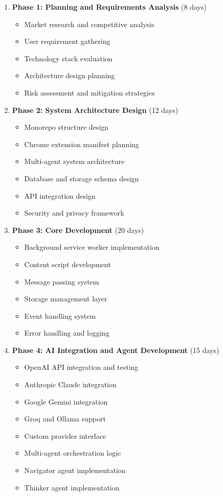 \documentclass[12pt,a4paper]{article}
\begin{document}
\begin{enumerate}
    \item \textbf{Phase 1: Planning and Requirements Analysis} (8 days)
    \begin{itemize}
        \item Market research and competitive analysis
        \item User requirement gathering
        \item Technology stack evaluation
        \item Architecture design planning
        \item Risk assessment and mitigation strategies
    \end{itemize}
    
    \item \textbf{Phase 2: System Architecture Design} (12 days)
    \begin{itemize}
        \item Monorepo structure design
        \item Chrome extension manifest planning
        \item Multi-agent system architecture
        \item Database and storage schema design
        \item API integration design
        \item Security and privacy framework
    \end{itemize}
    
    \item \textbf{Phase 3: Core Development} (20 days)
    \begin{itemize}
        \item Background service worker implementation
        \item Content script development
        \item Message passing system
        \item Storage management layer
        \item Event handling system
        \item Error handling and logging
    \end{itemize}
    
    \item \textbf{Phase 4: AI Integration and Agent Development} (15 days)
    \begin{itemize}
        \item OpenAI API integration and testing
        \item Anthropic Claude integration
        \item Google Gemini integration
        \item Groq and Ollama support
        \item Custom provider interface
        \item Multi-agent orchestration logic
        \item Navigator agent implementation
        \item Thinker agent implementation
    \end{itemize}
    

\end{enumerate}
\end{document}
